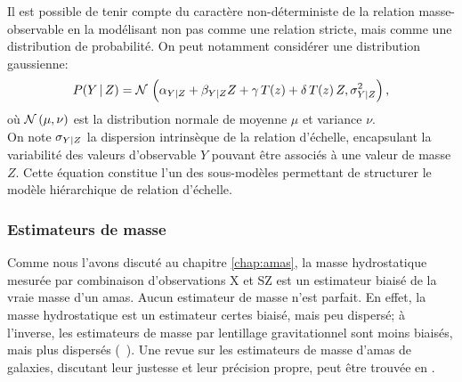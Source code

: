 Il est possible de tenir compte du caractère non-déterministe de la relation masse-observable en la modélisant non pas comme une relation stricte, mais comme une distribution de probabilité.
On peut notamment considérer une distribution gaussienne:
\begin{equation}
    \label{eq:scaling:general_pdf}
    P({Y\,|\,Z}) = \mathcal{N}\, \left(\alpha_{Y|Z} + \beta_{Y|Z} Z + \gamma \, T(z) + \delta \, T(z) \, Z, \sigma_{Y|Z}^2 \right),
\end{equation}
où $\mathcal{N}\,(\mu, \nu)$ est la distribution normale de moyenne $\mu$ et variance $\nu$. \\
On note $\sigma_{Y|Z}$ la dispersion intrinsèque de la relation d'échelle, encapsulant la variabilité des valeurs d'observable $Y$ pouvant être associés à une valeur de masse $Z$.
Cette équation constitue l'un des sous-modèles permettant de structurer le modèle hiérarchique de relation d'échelle.

\subsubsection{Estimateurs de masse} %
\label{sec:eddington_biases}

Comme nous l'avons discuté au chapitre \ref{chap:amas}, la masse hydrostatique mesurée par combinaison d'observations X et SZ est un estimateur biaisé de la vraie masse d'un amas.
Aucun estimateur de masse n'est parfait.
En effet, la masse hydrostatique est un estimateur certes biaisé, mais peu dispersé; à l'inverse, les estimateurs de masse par lentillage gravitationnel sont moins biaisés, mais plus dispersés (\eg\ \cite{grandis_calibration_2021,sommer_weak_2021}).
Une revue sur les estimateurs de masse d'amas de galaxies, discutant leur justesse et leur précision propre, peut être trouvée en \cite{pratt_galaxy_2019}.

